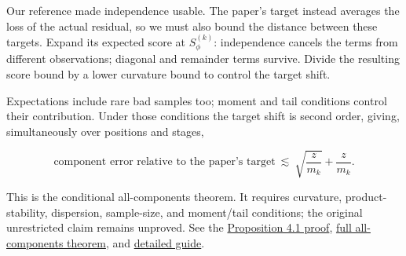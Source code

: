 \documentclass[12pt]{article}
\newcommand{\sub}[1]{\par\vspace{4pt}{\sffamily\bfseries\large #1}\par}
\newcommand{\captiontext}[1]{{\small\color{muted}#1}\par}
\begin{document}
\sub{Transfer to the paper's population target}
Our reference made independence usable. The paper's target instead averages
the loss of the actual residual, so we must also bound the distance between
these targets. Expand its expected score at $S_\phi^{(k)}$:
independence cancels the terms from different observations; diagonal and
remainder terms survive. Divide the resulting score bound by a lower curvature
bound to control the target shift.

Expectations include rare bad samples too; moment and tail conditions control
their contribution. Under those conditions the target shift is second order,
giving, simultaneously over positions and stages,
\begin{takeaway}
\[
 \text{component error relative to the paper's target}
 \ \lesssim\ \sqrt{\frac z{m_k}}+\frac z{m_k}.
\]
\end{takeaway}
\captiontext{This is the conditional all-components theorem. It requires
curvature, product-stability, dispersion, sample-size, and moment/tail conditions;
the original unrestricted claim remains unproved.
See the \href{../proposition_4_1_lemma_4_2.tex}{Proposition 4.1 proof},
\href{../irmf_all_components_bound.pdf}{full all-components theorem}, and
\href{../irmf_all_components_guide/irmf_all_components_guide.pdf}{detailed guide}.}
\end{document}
